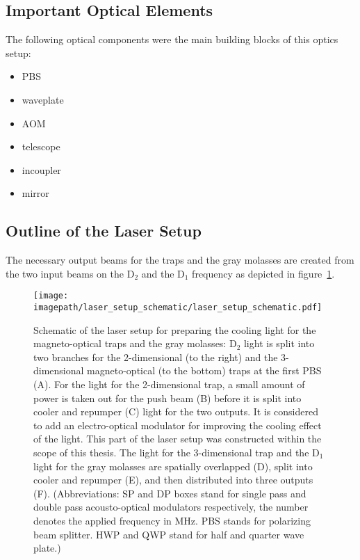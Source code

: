 \subsection*{Important Optical Elements}
The following optical components were the main building blocks of this optics setup: 
\begin{itemize}
    \item PBS
    \item waveplate
    \item AOM
    \item telescope
    \item incoupler
    \item mirror
\end{itemize}

\subsection*{Outline of the Laser Setup}
The necessary output beams for the traps and the gray molasses are created from the two input beams on the D$_2$ and the D$_1$ frequency as depicted in figure~\ref{fig:laser_setup_schematic}.



\begin{figure}
    \centering
    \texttt{[image: \\imagepath/laser\_setup\_schematic/laser\_setup\_schematic.pdf]}
    \caption{Schematic of the laser setup for preparing the cooling light for the magneto-optical traps and the gray molasses: D$_2$ light is split into two branches for the 2-dimensional (to the right) and the 3-dimensional magneto-optical (to the bottom) traps at the first PBS (A).
    For the light for the 2-dimensional trap, a small amount of power is taken out for the push beam (B) before it is split into cooler and repumper (C) light for the two outputs. It is considered to add an electro-optical modulator for improving the cooling effect of the light. This part of the laser setup was constructed within the scope of this thesis.
    The light for the 3-dimensional trap and the D$_1$ light for the gray molasses are spatially overlapped (D), split into cooler and repumper (E), and then distributed into three outputs (F).
    (Abbreviations: SP and DP boxes stand for single pass and double pass acousto-optical modulators respectively, the number denotes the applied frequency in \si{\mega\hertz}. PBS stands for polarizing beam splitter. HWP and QWP stand for half and quarter wave plate.)
    }
    \label{fig:laser_setup_schematic}
\end{figure}

